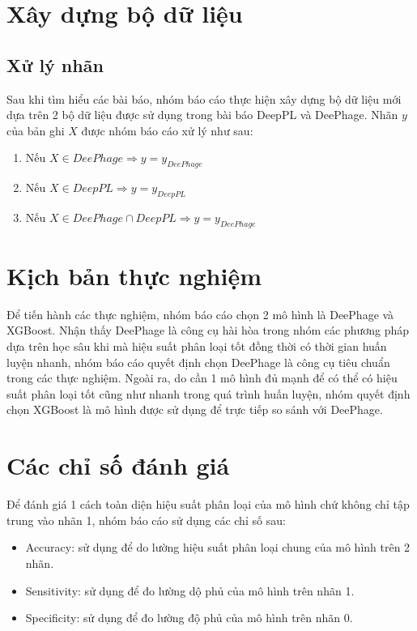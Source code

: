 \section{Xây dựng bộ dữ liệu}
\subsection{ Xử lý nhãn }
Sau khi tìm hiểu các bài báo, nhóm báo cáo thực hiện xây dựng bộ dữ liệu mới dựa trên 2 bộ dữ liệu được sử dụng trong bài báo DeepPL và DeePhage. Nhãn $y$ của bản ghi $X$ được nhóm báo cáo xử lý như sau:
\begin{enumerate}
    \item Nếu $X \in DeePhage \Rightarrow y = y_{DeePhage}$ 
    \item Nếu $X \in DeepPL \Rightarrow y = y_{DeepPL}$
    \item Nếu $X \in DeePhage \cap DeepPL \Rightarrow y = y_{DeePhage}$
\end{enumerate}

\section{Kịch bản thực nghiệm}\label{ kịch bản thực nghiệm}
Để tiến hành các thực nghiệm, nhóm báo cáo chọn 2 mô hình là DeePhage và XGBoost. Nhận thấy DeePhage là công cụ  hài hòa trong nhóm các phương pháp dựa trên học sâu khi mà hiệu suất phân loại tốt đồng thời có thời gian huấn luyện nhanh, nhóm báo cáo quyết định chọn DeePhage là công cụ tiêu chuẩn trong các thực nghiệm. Ngoài ra, do cần 1 mô hình đủ mạnh để có thể có hiệu suất phân loại tốt cũng như nhanh trong quá trình huấn luyện, nhóm quyết định chọn XGBoost là mô hình được sử dụng để trực tiếp so sánh với DeePhage.

\section{Các chỉ số đánh giá}
Để đánh giá 1 cách toàn diện hiệu suất phân loại của mô hình chứ không chỉ tập trung vào nhãn 1, nhóm báo cáo sử dụng các chỉ số sau:
\begin{itemize}
    \item Accuracy: sử dụng để do lường hiệu suất phân loại chung của mô hình trên 2 nhãn.
    \item Sensitivity: sử dụng để đo lường dộ phủ của mô hình trên nhãn 1.
    \item Specificity: sử dụng để đo lường độ phủ của mô hình trên nhãn 0.
\end{itemize}


